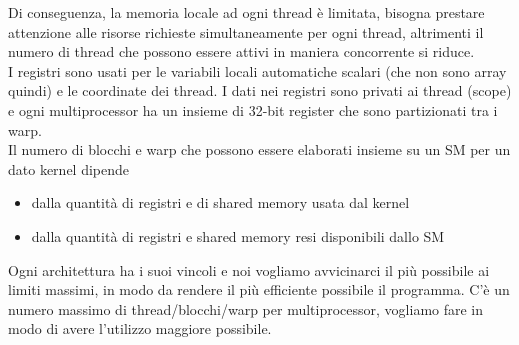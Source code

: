 Di conseguenza, la memoria locale ad ogni thread è limitata, bisogna prestare attenzione alle risorse richieste simultaneamente per ogni thread, altrimenti il numero di thread che possono essere attivi in maniera concorrente si riduce.\\

I registri sono usati per le variabili locali automatiche scalari (che non sono array quindi) e le coordinate dei thread. I dati nei registri sono privati ai thread (scope) e ogni multiprocessor ha un insieme di 32-bit register che sono partizionati tra i warp.\\


Il numero di blocchi e warp che possono essere elaborati insieme su un SM per un dato kernel dipende
\begin{itemize}
	\item dalla quantità di registri e di shared memory usata dal kernel
	\item dalla quantità di registri e shared memory resi disponibili dallo SM
\end{itemize}
Ogni architettura ha i suoi vincoli e noi vogliamo avvicinarci il più possibile ai limiti massimi, in modo da rendere il più efficiente possibile il programma. C'è un numero massimo di thread/blocchi/warp per multiprocessor, vogliamo fare in modo di avere l'utilizzo maggiore possibile.\\

\newpage

